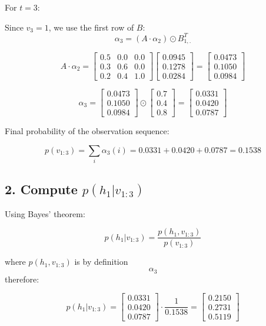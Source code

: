 \documentclass{article}
\begin{document}
For \( t = 3 \):

Since \( v_3 = 1 \), we use the first row of \( B \):
\[
\alpha_3 = (A \cdot \alpha_2) \odot B_{1,.}^T
\]


\[
A \cdot \alpha_2 =
\begin{bmatrix} 
0.5 & 0.0 & 0.0 \\
0.3 & 0.6 & 0.0 \\
0.2 & 0.4 & 1.0
\end{bmatrix}
\begin{bmatrix} 
0.0945 \\ 0.1278 \\ 0.0284
\end{bmatrix}
=
\begin{bmatrix} 
0.0473 \\ 0.1050 \\ 0.0984
\end{bmatrix}
\]


\[
\alpha_3 = 
\begin{bmatrix} 
0.0473 \\ 0.1050 \\ 0.0984
\end{bmatrix} \odot 
\begin{bmatrix} 
0.7 \\ 0.4 \\ 0.8
\end{bmatrix}
=
\begin{bmatrix} 
0.0331 \\ 0.0420 \\ 0.0787
\end{bmatrix}
\]

Final probability of the observation sequence:

\[
p(v_{1:3}) = \sum_i \alpha_3(i) = 0.0331 + 0.0420 + 0.0787 = 0.1538
\]

\subsection*{2. Compute \( p(h_1 | v_{1:3}) \)}

Using Bayes' theorem:

\[
p(h_1 | v_{1:3}) = \frac{p(h_1, v_{1:3})}{p(v_{1:3})}
\]

where \( p(h_1, v_{1:3})\) is by definition \[ \alpha_3\] therefore:


\[
p(h_1 | v_{1:3}) = 
\begin{bmatrix} 
0.0331 \\ 0.0420 \\ 0.0787
\end{bmatrix} 
\cdot \frac{1}{0.1538}
=
\begin{bmatrix}
0.2150 \\ 0.2731 \\ 0.5119
\end{bmatrix}
\]
\end{document}

